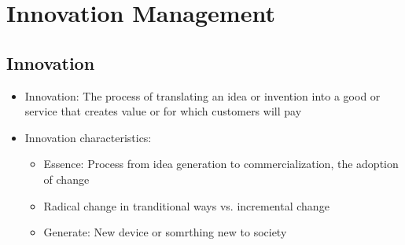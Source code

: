 \documentclass[openany,12pt,a4paper]{book}
\begin{document}
\chapter{Innovation Management}
\section{Innovation}
\begin{itemize}
    \item Innovation: The process of translating an idea or invention into a good or service that creates value or for which customers will pay
    \item Innovation characteristics:
    \begin{itemize}
        \item Essence: Process from idea generation to commercialization, the adoption of change
        \item Radical change in tranditional ways vs. incremental change
        \item Generate: New device or somrthing new to society
    \end{itemize}
\end{itemize}
\end{document}
